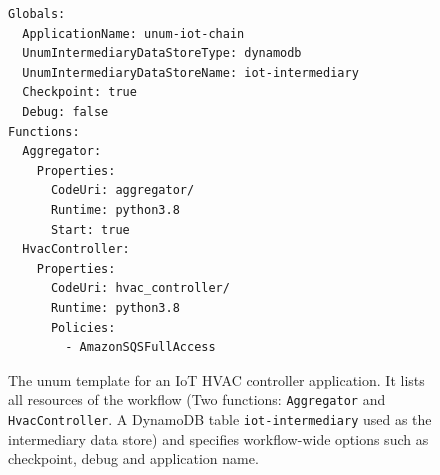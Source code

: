 %
%


\begin{figure}[]
    \begin{verbatim}
Globals:
  ApplicationName: unum-iot-chain
  UnumIntermediaryDataStoreType: dynamodb
  UnumIntermediaryDataStoreName: iot-intermediary
  Checkpoint: true
  Debug: false
Functions:
  Aggregator:
    Properties:
      CodeUri: aggregator/
      Runtime: python3.8
      Start: true
  HvacController:
    Properties:
      CodeUri: hvac_controller/
      Runtime: python3.8
      Policies:
        - AmazonSQSFullAccess
  \end{verbatim}
    \caption{The unum template for an IoT HVAC controller
    application. It lists all resources of the workflow (Two functions:
    \texttt{Aggregator} and \texttt{HvacController}. A DynamoDB table
    \texttt{iot-intermediary} used as the intermediary data store) and
    specifies workflow-wide options such as checkpoint, debug and
    application name.}
    \label{fig:iot-unum-template}
\end{figure}


